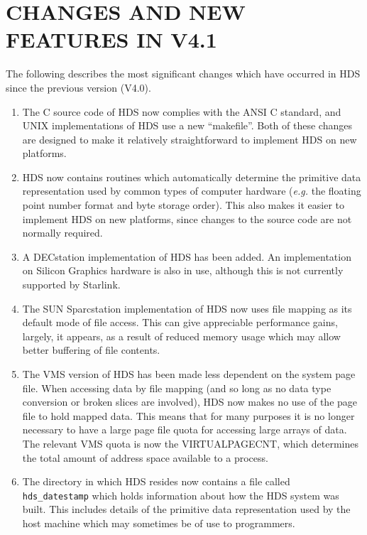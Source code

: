 \section{CHANGES AND NEW FEATURES IN V4.1}

The following describes the most significant changes which have occurred in HDS
since the previous version (V4.0).

\begin{enumerate}

\item
The C source code of HDS now complies with the ANSI C standard, and UNIX
implementations of HDS use a new ``makefile''. Both of these changes are
designed to make it relatively straightforward to implement HDS on new
platforms.

\item
HDS now contains routines which automatically determine the primitive data
representation used by common types of computer hardware ({\em e.g.} the
floating point number format and byte storage order). This also makes it easier
to implement HDS on new platforms, since changes to the source code are not
normally required.

\item
A DECstation implementation of HDS has been added. An implementation on Silicon
Graphics hardware is also in use, although this is not currently supported by
Starlink.

\item
The SUN Sparcstation implementation of HDS now uses file mapping as its default
mode of file access. This can give appreciable performance gains, largely, it
appears, as a result of reduced memory usage which may allow better buffering of
file contents.

\item
The VMS version of HDS has been made less dependent on the system page file.
When accessing data by file mapping (and so long as no data type conversion or
broken slices are involved), HDS now makes no use of the page file to hold
mapped data. This means that for many purposes it is no longer necessary to have
a large page file quota for accessing large arrays of data. The relevant VMS
quota is now the VIRTUALPAGECNT, which determines the total amount of address
space available to a process.

\item
The directory in which HDS resides now contains a file called {\tt
hds\_datestamp} which holds information about how the HDS system was built. This
includes details of the primitive data representation used by the host machine
which may sometimes be of use to programmers.


\end{enumerate}
